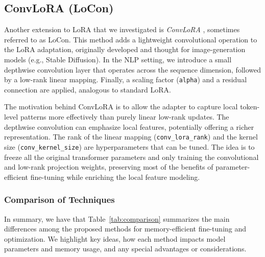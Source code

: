 \subsection{ConvLoRA (LoCon)}
Another extension to LoRA that we investigated is \textit{ConvLoRA} \cite{zhong2024convolutionmeetsloraparameter}, sometimes referred to as LoCon. This method adds a lightweight convolutional operation to the LoRA adaptation, originally developed and thought for image-generation models (e.g., Stable Diffusion). In the NLP setting, we introduce a small depthwise convolution layer that operates across the sequence dimension, followed by a low-rank linear mapping. Finally, a scaling factor (\texttt{alpha}) and a residual connection are applied, analogous to standard LoRA.

The motivation behind ConvLoRA is to allow the adapter to capture local token-level patterns more effectively than purely linear low-rank updates. The depthwise convolution can emphasize local features, potentially offering a richer representation. The rank of the linear mapping (\texttt{conv\_lora\_rank}) and the kernel size (\texttt{conv\_kernel\_size}) are hyperparameters that can be tuned. The idea is to freeze all the original transformer parameters and only training the convolutional and low-rank projection weights, preserving most of the benefits of parameter-efficient fine-tuning while enriching the local feature modeling.

\subsubsection{Comparison of Techniques}
In summary, we have that Table~\ref{tab:comparison} summarizes the main differences among the proposed methods for memory-efficient fine-tuning and optimization. We highlight key ideas, how each method impacts model parameters and memory usage, and any special advantages or considerations.

